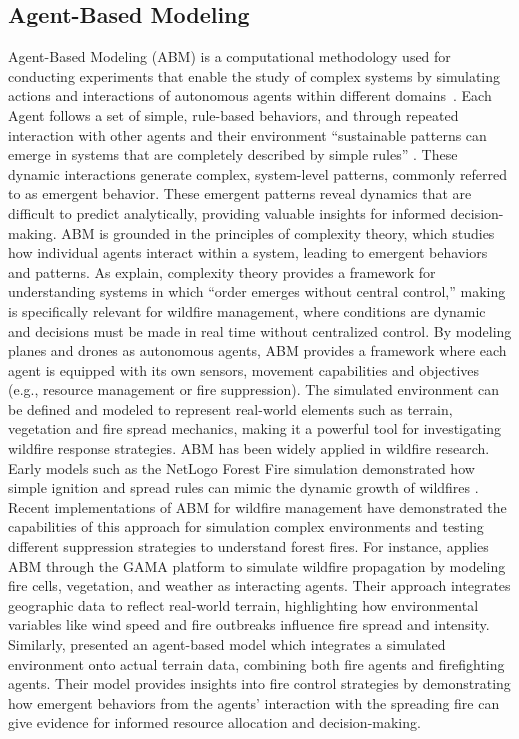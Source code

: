 \documentclass[11pt, a4paper]{article}
\begin{document}
\subsection{Agent-Based Modeling}
Agent-Based Modeling (ABM) is a computational methodology used for conducting experiments that enable the study of complex systems by simulating actions and interactions of autonomous agents within different domains \citep{wilensky2015introduction}. Each Agent follows a set of simple, rule-based behaviors, and through repeated interaction with other agents and their environment “sustainable patterns can emerge in systems that are completely described by simple rules” \citep[p.5]{intro_to_abm}. These dynamic interactions generate complex, system-level patterns, commonly referred to as emergent behavior. These emergent patterns reveal dynamics that are difficult to predict analytically, providing valuable insights for informed decision-making.
ABM is grounded in the principles of complexity theory, which studies how individual agents interact within a system, leading to emergent behaviors and patterns. As \citet*{wilensky2015introduction} explain, complexity theory provides a framework for understanding systems in which ``order emerges without central control,'' making is specifically relevant for wildfire management, where conditions are dynamic and decisions must be made in real time without centralized control. By modeling planes and drones as autonomous agents, ABM provides a framework where each agent is equipped with its own sensors, movement capabilities and objectives (e.g., resource management or fire suppression). The simulated environment can be defined and modeled to represent real-world elements such as terrain, vegetation and fire spread mechanics, making it a powerful tool for investigating wildfire response strategies.
ABM has been widely applied in wildfire research. Early models such as the NetLogo Forest Fire simulation demonstrated how simple ignition and spread rules can mimic the dynamic growth of wildfires \citep{wilensky2015introduction}. Recent implementations of ABM for wildfire management have demonstrated the capabilities of this approach for simulation complex environments and testing different suppression strategies to understand forest fires. For instance, \citet*{MorenoEspino2025} applies ABM through the GAMA platform \citep{Gamma} to simulate wildfire propagation by modeling fire cells, vegetation, and weather as interacting agents. Their approach integrates geographic data to reflect real-world terrain, highlighting how environmental variables like wind speed and fire outbreaks influence fire spread and intensity. Similarly, \citet*{Dorrer_2020} presented an agent-based model which integrates a simulated environment onto actual terrain data, combining both fire agents and firefighting agents. Their model provides insights into fire control strategies by demonstrating how emergent behaviors from the agents' interaction with the spreading fire can give evidence for informed resource allocation and decision-making.
\end{document}
